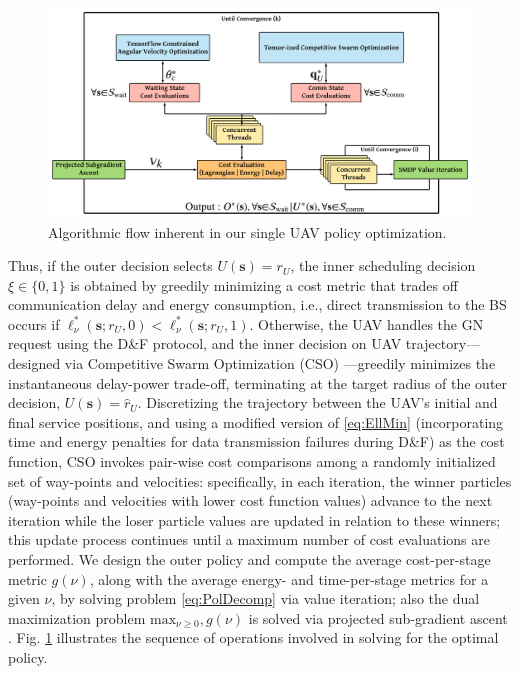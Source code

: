 \documentclass[10pt,twocolumn]{IEEEtran}
\begin{document}
\begin{figure} [t]
    \centering
    \includegraphics[width=0.9\linewidth]{figs/Policy_Optimization_Flow_Chart.png}
    \vspace{-2mm}
    \caption{Algorithmic flow inherent in our single UAV policy optimization.}
    \vspace{-7mm}
    \label{F5}
\end{figure}
\noindent Thus, if the outer decision selects $U(\mathbf{s}){=}r_{U}$, the inner scheduling decision $\xi{\in}\{0,1\}$ is obtained by greedily minimizing a cost metric that trades off communication delay and energy consumption, i.e., direct transmission to the BS occurs if $\ell_{\nu}^{*}(\mathbf{s}; r_{U},0){<}\ell_{\nu}^{*}(\mathbf{s};r_{U},1)$. Otherwise, the UAV handles the GN request using the D\&F protocol, and the inner decision on UAV trajectory---designed via Competitive Swarm Optimization (CSO) \cite{CSO}---greedily minimizes the instantaneous delay-power trade-off, terminating at the target radius of the outer decision, $U(\mathbf{s}){=}\hat{r}_{U}$. Discretizing the trajectory between the UAV's initial and final service positions, and using a modified version of \eqref{eq:EllMin} (incorporating time and energy penalties for data transmission failures during D\&F) as the cost function, CSO invokes pair-wise cost comparisons among a randomly initialized set of way-points and velocities: specifically, in each iteration, the winner particles (way-points and velocities with lower cost function values) advance to the next iteration while the loser particle values are updated in relation to these winners; this update process continues until a maximum number of cost evaluations are performed. We design the outer policy and compute the average cost-per-stage metric $g(\nu)$, along with the average energy- and time-per-stage metrics for a given $\nu$, by solving problem \eqref{eq:PolDecomp} via value iteration; also the dual maximization problem $\mathrm{max}_{\nu{\geq}0},g(\nu)$ is solved via projected sub-gradient ascent \cite{SubgradientMethods}. Fig. \ref{F5} illustrates the sequence of operations involved in solving for the optimal policy.
\end{document}
